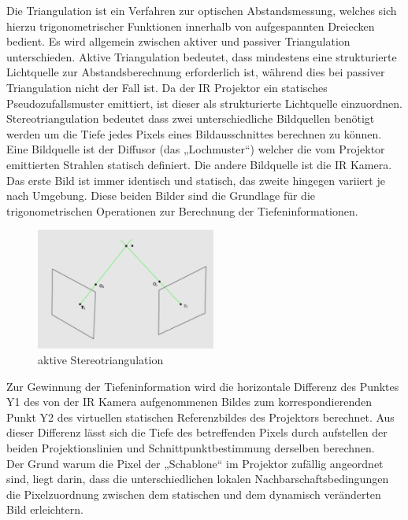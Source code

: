 Die Triangulation ist ein Verfahren zur optischen Abstandsmessung, welches sich hierzu trigonometrischer Funktionen innerhalb von aufgespannten Dreiecken bedient. 
Es wird allgemein zwischen aktiver und passiver Triangulation unterschieden.
Aktive Triangulation bedeutet, dass mindestens eine strukturierte Lichtquelle zur Abstandsberechnung erforderlich ist, während dies bei passiver Triangulation nicht der Fall ist.
Da der IR Projektor ein statisches Pseudozufallsmuster emittiert, ist dieser als strukturierte Lichtquelle einzuordnen.
Stereotriangulation bedeutet dass zwei unterschiedliche Bildquellen benötigt werden um die Tiefe jedes Pixels eines Bildausschnittes berechnen zu können.
Eine Bildquelle ist der Diffusor (das „Lochmuster“) welcher die vom Projektor emittierten Strahlen statisch definiert. Die andere Bildquelle ist die IR Kamera.
Das erste Bild ist immer identisch und statisch, das zweite hingegen variiert je nach Umgebung. Diese beiden Bilder sind die Grundlage für die trigonometrischen Operationen zur Berechnung der Tiefeninformationen.
\begin{figure}
  \vspace{-20pt}
  \begin{center}
        \includegraphics[height=4cm]{Res/Triangulation.png}
  \end{center}
  \vspace{-20pt}
  \caption{aktive Stereotriangulation }
  \vspace{-10pt}
\end{figure}

 Zur Gewinnung der Tiefeninformation wird die horizontale Differenz des Punktes Y1 des von der IR Kamera aufgenommenen Bildes zum korrespondierenden Punkt Y2 des virtuellen statischen Referenzbildes des Projektors berechnet. Aus dieser Differenz lässt sich die Tiefe des betreffenden Pixels durch aufstellen der beiden Projektionslinien und Schnittpunktbestimmung derselben berechnen. \\
 

Der Grund warum die Pixel der „Schablone“ im Projektor zufällig angeordnet sind, liegt darin, dass die unterschiedlichen lokalen Nachbarschaftsbedingungen die Pixelzuordnung zwischen dem statischen und dem dynamisch veränderten Bild erleichtern.


